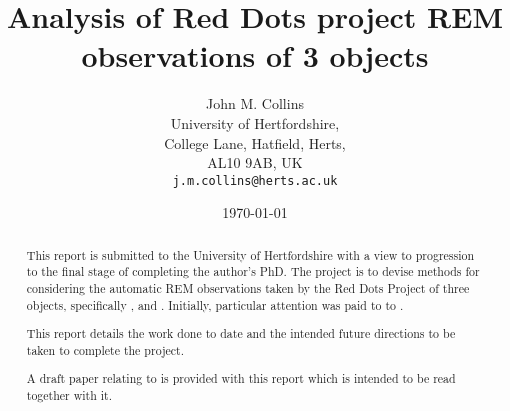 \title{Analysis of Red Dots project REM observations of 3 {\rdwarf} objects}

\author{John M. Collins\\
  University of Hertfordshire,\\
  College Lane, Hatfield, Herts, \\
  AL10 9AB, UK\\
  \texttt{j.m.collins@herts.ac.uk}\\
  }
\engwithth
\date{\today}
\maketitle

\protect\label{firstpage}

\begin{abstract}

  This report is submitted to the University of Hertfordshire with a
  view to progression to the final stage of completing the author's
  PhD. The project is to devise methods for considering the automatic REM
  observations taken by the Red Dots Project of three {\rdwarf} objects,
  specifically \prox, {\bstar} and \ross. Initially, particular attention was
  paid to to \ross.

  This report details the work done to date and the intended future directions
  to be taken to complete the project.

  A draft paper relating to {\ross} is provided with this report which is
  intended to be read together with it.


\end{abstract}

